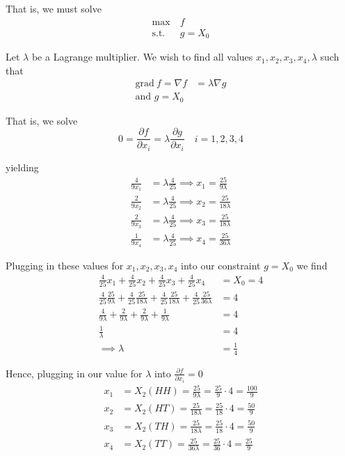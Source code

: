 \documentclass[12pt]{article}
\begin{document}
That is, we must solve
\begin{align*}
	\max~&f \\
	\text{s.t.}~&g = X_0
\end{align*}

Let $\lambda$ be a Lagrange multiplier. We wish to find all values $x_1, x_2, x_3, x_4, \lambda$ such that
\begin{align*}
	\text{grad}~f = \nabla f &= \lambda \nabla g \\
	\text{and } g = X_0
\end{align*}

That is, we solve
\begin{equation*}
	0 = \frac{ \partial f }{ \partial x_i } = \lambda \frac{ \partial g }{ \partial x_i } \quad i = 1, 2, 3, 4
\end{equation*}

yielding
\begin{align*}
	\frac{4}{9x_1} &= \lambda \frac{4}{25} \implies x_1 = \frac{25}{9\lambda} \\
	\frac{2}{9x_2} &= \lambda \frac{4}{25} \implies x_2 = \frac{25}{18\lambda} \\
	\frac{2}{9x_3} &= \lambda \frac{4}{25} \implies x_3 = \frac{25}{18\lambda} \\
	\frac{1}{9x_4} &= \lambda \frac{4}{25} \implies x_4 = \frac{25}{36\lambda}
\end{align*}

Plugging in these values for $x_1, x_2, x_3, x_4$ into our constraint $g = X_0$ we find
\begin{align*}
	\frac{4}{25}x_1 + \frac{4}{25}x_2 + \frac{4}{25}x_3 + \frac{4}{25}x_4 &= X_0 = 4 \\
	\frac{4}{25}\frac{25}{9\lambda} + \frac{4}{25}\frac{25}{18\lambda} + \frac{4}{25}\frac{25}{18\lambda} + \frac{4}{25}\frac{25}{36\lambda} &= 4 \\
	\frac{4}{9\lambda} + \frac{2}{9\lambda} + \frac{2}{9\lambda} + \frac{1}{9\lambda} &= 4 \\
	\frac{1}{\lambda} &= 4 \\
	\implies \lambda &= \frac{1}{4}
\end{align*}

Hence, plugging in our value for $\lambda$ into $\frac{ \partial f }{\partial x_i} = 0$
\begin{align*}
	x_1 &= X_2(HH) = \frac{25}{9\lambda} = \frac{25}{9} \cdot 4 = \frac{100}{9} \\
	x_2 &= X_2(HT) = \frac{25}{18\lambda} = \frac{25}{18} \cdot 4 = \frac{50}{9} \\
	x_3 &= X_2(TH) = \frac{25}{18\lambda} = \frac{25}{18} \cdot 4 = \frac{50}{9} \\
	x_4 &= X_2(TT) = \frac{25}{36\lambda} = \frac{25}{36} \cdot 4	= \frac{25}{9}
\end{align*}
\end{document}
